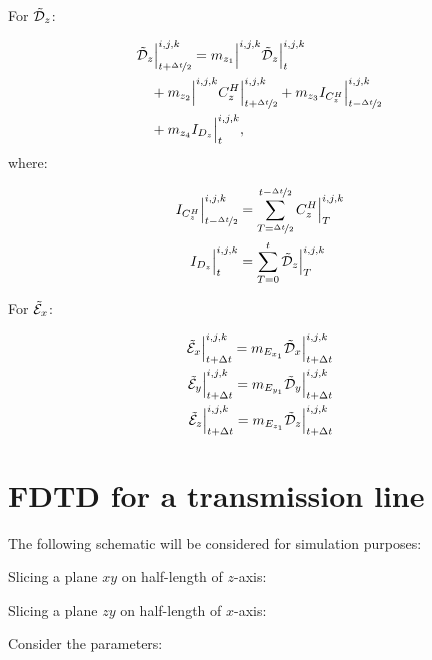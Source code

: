 For $\tilde{\mathcal{D}}_z$:

\begin{align}
    &\tilde{\mathcal{D}}_z\Big|_{t+\nicefrac{\Delta t}{2}}^{i,j,k} = m_{{z_1}}\Big|^{i,j,k} \tilde{\mathcal{D}}_z\Big|_{t}^{i,j,k} 
    \nonumber \\
    & \quad + m_{{z_2}}\Big|^{i,j,k}C_z^H\Big|^{i,j,k}_{t+\nicefrac{\Delta t}{2}} + m_{{z_3}} I_{C^H_z}\Big|^{i,j,k}_{t-\nicefrac{\Delta t}{2}} 
    \nonumber \\
    & \quad + m_{{z_4}} I_{D_z}\Big|^{i,j,k}_{t},
\end{align}
where:

\begin{align}
    I_{C^H_z}\Big|^{i,j,k}_{t-\nicefrac{\Delta t}{2}} &= \sum\limits_{T=\nicefrac{\Delta t}{2}}^{t-\nicefrac{\Delta t}{2}}C_z^H\Big|^{i,j,k}_T
    \\
    I_{D_z}\Big|^{i,j,k}_{t} &= \sum\limits_{T=0}^{t} \tilde{\mathcal{D}}_z\Big|^{i,j,k}_T
\end{align}

For $\tilde{\mathcal{E}}_x$:

\begin{align}
    \tilde{\mathcal{E}}_x\Big|^{i,j,k}_{t+\Delta t} = m_{E_{x_1}} \tilde{\mathcal{D}}_x\Big|^{i,j,k}_{t+\Delta t} \\
    \tilde{\mathcal{E}}_y\Big|^{i,j,k}_{t+\Delta t} = m_{E_{y_1}} \tilde{\mathcal{D}}_y\Big|^{i,j,k}_{t+\Delta t} \\
    \tilde{\mathcal{E}}_z\Big|^{i,j,k}_{t+\Delta t} = m_{E_{z_1}} \tilde{\mathcal{D}}_z\Big|^{i,j,k}_{t+\Delta t}
\end{align}


\section{FDTD for a transmission line}

The following schematic will be considered for simulation purposes:



Slicing a plane $xy$ on half-length of $z$-axis:



Slicing a plane $zy$ on half-length of $x$-axis:



Consider the parameters:

